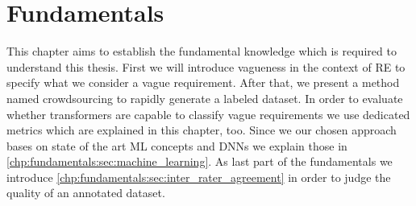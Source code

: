 \chapter{Fundamentals}
\label{chp:fundamentals}

This chapter aims to establish the fundamental knowledge which is required to understand this thesis.
First we will introduce vagueness in the context of \ac{RE} to specify what we consider a vague requirement.
After that, we present a method named crowdsourcing to rapidly generate a labeled dataset.
In order to evaluate whether transformers are capable to classify vague requirements we use dedicated metrics which are explained in this chapter, too.
Since we our chosen approach bases on state of the art \ac{ML} concepts and \acp{DNN} we explain those in \cref{chp:fundamentals:sec:machine_learning}.
As last part of the fundamentals we introduce \cref{chp:fundamentals:sec:inter_rater_agreement} in order to judge the quality of an annotated dataset.






